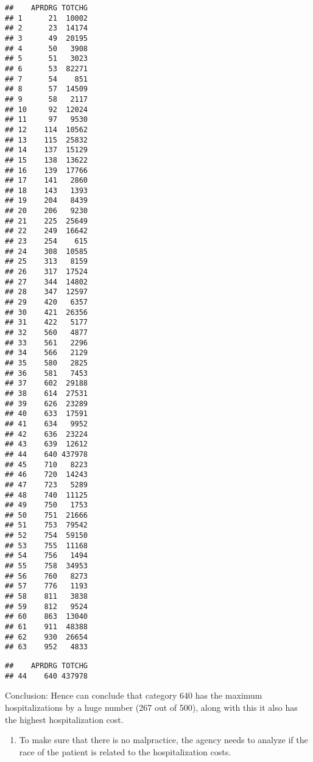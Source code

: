 \documentclass[
]{article}
\newenvironment{Shaded}{\begin{snugshade}}{\end{snugshade}}
\newcommand{\KeywordTok}[1]{\textcolor[rgb]{0.13,0.29,0.53}{\textbf{#1}}}
\newcommand{\NormalTok}[1]{#1}
\newcommand{\OperatorTok}[1]{\textcolor[rgb]{0.81,0.36,0.00}{\textbf{#1}}}
\providecommand{\tightlist}{%
  \setlength{\itemsep}{0pt}\setlength{\parskip}{0pt}}
\begin{document}
\begin{verbatim}
##    APRDRG TOTCHG
## 1      21  10002
## 2      23  14174
## 3      49  20195
## 4      50   3908
## 5      51   3023
## 6      53  82271
## 7      54    851
## 8      57  14509
## 9      58   2117
## 10     92  12024
## 11     97   9530
## 12    114  10562
## 13    115  25832
## 14    137  15129
## 15    138  13622
## 16    139  17766
## 17    141   2860
## 18    143   1393
## 19    204   8439
## 20    206   9230
## 21    225  25649
## 22    249  16642
## 23    254    615
## 24    308  10585
## 25    313   8159
## 26    317  17524
## 27    344  14802
## 28    347  12597
## 29    420   6357
## 30    421  26356
## 31    422   5177
## 32    560   4877
## 33    561   2296
## 34    566   2129
## 35    580   2825
## 36    581   7453
## 37    602  29188
## 38    614  27531
## 39    626  23289
## 40    633  17591
## 41    634   9952
## 42    636  23224
## 43    639  12612
## 44    640 437978
## 45    710   8223
## 46    720  14243
## 47    723   5289
## 48    740  11125
## 49    750   1753
## 50    751  21666
## 51    753  79542
## 52    754  59150
## 53    755  11168
## 54    756   1494
## 55    758  34953
## 56    760   8273
## 57    776   1193
## 58    811   3838
## 59    812   9524
## 60    863  13040
## 61    911  48388
## 62    930  26654
## 63    952   4833
\end{verbatim}

\begin{Shaded}
\end{Shaded}

\begin{verbatim}
##    APRDRG TOTCHG
## 44    640 437978
\end{verbatim}

Conclusion: Hence can conclude that category 640 has the maximum
hospitalizations by a huge number (267 out of 500), along with this it
also has the highest hospitalization cost.

\begin{enumerate}
\def\labelenumi{\Roman{enumi}.}
\setcounter{enumi}{2}
\tightlist
\item
  To make sure that there is no malpractice, the agency needs to analyze
  if the race of the patient is related to the hospitalization costs.
\end{enumerate}
\end{document}
